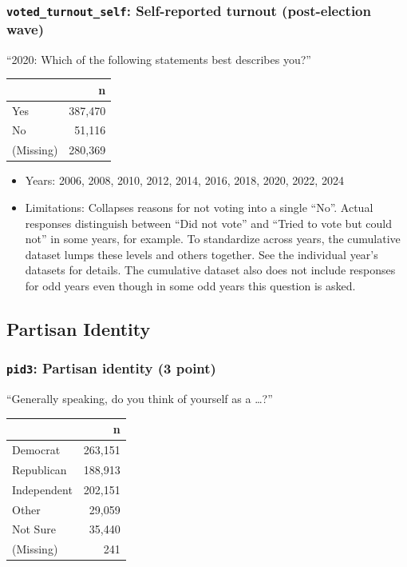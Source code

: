 \documentclass[10pt,article,oneside]{memoir}
\begin{document}
\subsubsection{\texorpdfstring{\texttt{voted\_turnout\_self}:
Self-reported turnout (post-election
wave)}{voted\_turnout\_self: Self-reported turnout (post-election wave)}}\label{voted_turnout_self-self-reported-turnout-post-election-wave}

``2020: Which of the following statements best describes you?''

\begin{table}[H]
\centering
\begin{tabular}[t]{lr}
\toprule
 & n\\
\midrule
Yes & 387,470\\
No & 51,116\\
(Missing) & 280,369\\
\bottomrule
\end{tabular}
\end{table}

\begin{itemize}
\tightlist
\item
  Years: 2006, 2008, 2010, 2012, 2014, 2016, 2018, 2020, 2022, 2024
\item
  Limitations: Collapses reasons for not voting into a single ``No''.
  Actual responses distinguish between ``Did not vote'' and ``Tried to
  vote but could not'' in some years, for example. To standardize across
  years, the cumulative dataset lumps these levels and others together.
  See the individual year's datasets for details. The cumulative dataset
  also does not include responses for odd years even though in some odd
  years this question is asked.
\end{itemize}

\subsection{Partisan Identity}\label{partisan-identity}

\subsubsection{\texorpdfstring{\texttt{pid3}: Partisan identity (3
point)}{pid3: Partisan identity (3 point)}}\label{pid3-partisan-identity-3-point}

``Generally speaking, do you think of yourself as a \ldots?''

\begin{table}[H]
\centering
\begin{tabular}[t]{lr}
\toprule
 & n\\
\midrule
Democrat & 263,151\\
Republican & 188,913\\
Independent & 202,151\\
Other & 29,059\\
Not Sure & 35,440\\
(Missing) & 241\\
\bottomrule
\end{tabular}
\end{table}
\end{document}
